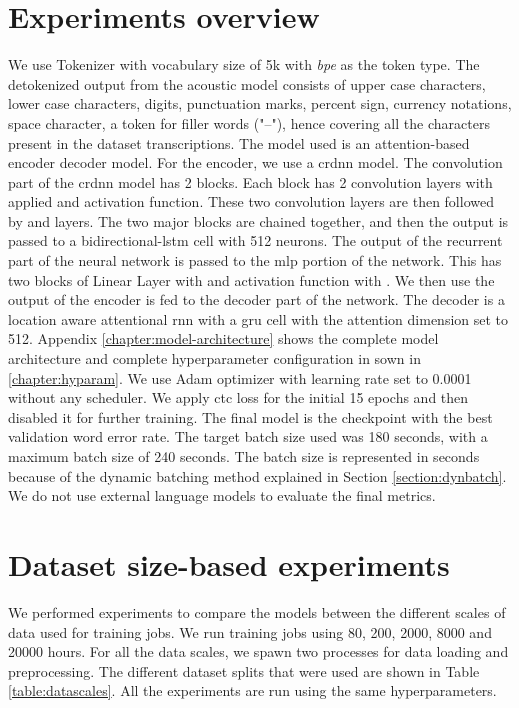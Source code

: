 \section{Experiments overview}
\label{section:exp_desc}
We use  Tokenizer with vocabulary size of 5k with \emph{bpe} as the token type. The detokenized output from the acoustic model consists of upper case characters, lower case characters, digits, punctuation marks, percent sign, currency notations, space character, a token for filler words ("--"), hence covering all the characters present in the dataset transcriptions. The model used is an attention-based encoder decoder model. For the encoder, we use a \acrshort{crdnn} model. The convolution part of the \acrshort{crdnn} model has 2  blocks. Each block has 2 convolution layers with  applied and  activation function. These two convolution layers are then followed by  and  layers. The two major blocks are chained together, and then the output is passed to a bidirectional-\acrshort{lstm} cell with 512 neurons. The output of the recurrent part of the neural network is passed to the \acrshort{mlp} portion of the network. This has two blocks of Linear Layer with  and  activation function with . We then use the output of the encoder is fed to the decoder part of the network. The decoder is a location aware attentional \acrshort{rnn} with a \acrshort{gru} cell with the attention dimension set to 512. Appendix \ref{chapter:model-architecture} shows the complete model architecture and complete hyperparameter configuration in sown in \ref{chapter:hyparam}. We use Adam optimizer with learning rate set to 0.0001 without any scheduler. We apply \acrshort{ctc} loss for the initial 15 epochs and then disabled it for further training. The final model is the checkpoint with the best validation word error rate. The target batch size used was 180 seconds, with a maximum batch size of 240 seconds. The batch size is represented in seconds because of the dynamic batching method explained in Section \ref{section:dynbatch}. We do not use external language models to evaluate the final metrics.  

\section{Dataset size-based experiments}
\label{section:res_scale}
We performed experiments to compare the models between the different scales of data used for training jobs. We run training jobs using 80, 200, 2000, 8000 and 20000 hours. For all the data scales, we spawn two processes for data loading and preprocessing. The different dataset splits that were used are shown in Table \ref{table:datascales}. All the experiments are run using the same hyperparameters. 

